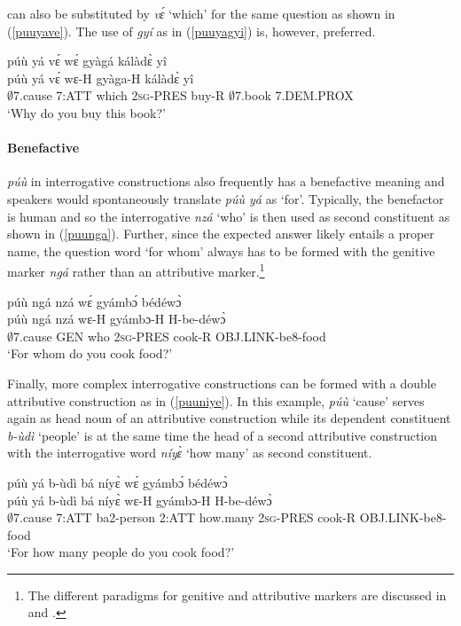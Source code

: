  can also be substituted by {\itshape vɛ́} `which' for the same question as shown in (\ref{puuyave}). The use of {\itshape gyí} as in (\ref{puuyagyi}) is, however, preferred.

\begin{exe}
\ex\label{puuyave}
 \glll  púù yá vɛ́ wɛ́ gyàgá kálàdɛ̀ yî \\
púù yá vɛ́ wɛ-H gyàga-H kálàdɛ̀ yî \\
          $\emptyset$7.cause 7:ATT which 2\textsc{sg}-PRES buy-R $\emptyset$7.book 7.DEM.PROX  \\
    \trans `Why do you buy this book?'
\end {exe}

\paragraph{Benefactive} {\itshape púù} in interrogative constructions also frequently has a benefactive meaning and speakers would spontaneously translate {\itshape púù yá} as `for'. Typically, the benefactor is human and so the interrogative {\itshape nzá} `who' is then used as second constituent as shown in (\ref{puunga}). Further, since the expected answer likely entails a proper name, the question word `for whom' always has to be formed with the genitive marker {\itshape ngá} rather than an attributive marker.\footnote{The different paradigms for genitive and attributive markers are discussed in  and .} 

\begin{exe}
\ex\label{puunga}
 \glll  púù ngá nzá wɛ́ gyámbɔ́ bédéwɔ̀ \\
   púù ngá nzá wɛ-H gyámbɔ-H H-be-déwɔ̀ \\
          $\emptyset$7.cause GEN who 2\textsc{sg}-PRES cook-R OBJ.LINK-be8-food  \\
    \trans `For whom do you cook food?'
\end {exe}

Finally, more complex interrogative constructions can be formed with a double attributive construction as in (\ref{puuniye}). In this example, {\itshape púù} `cause' serves again as head noun of an attributive construction while its dependent constituent {\itshape b-ùdì} `people' is at the same time the head of a second attributive construction with the interrogative word {\itshape níyɛ̀} `how many' as second constituent.

\begin{exe}
\ex\label{puuniye}
 \glll  púù yá b-ùdì bá níyɛ̀ wɛ́ gyámbɔ́ bédéwɔ̀ \\
    púù yá b-ùdì bá níyɛ̀ wɛ-H gyámbɔ-H H-be-déwɔ̀ \\
          $\emptyset$7.cause 7:ATT ba2-person 2:ATT how.many 2\textsc{sg}-PRES cook-R OBJ.LINK-be8-food  \\
    \trans `For how many people do you cook food?'
\end {exe}


